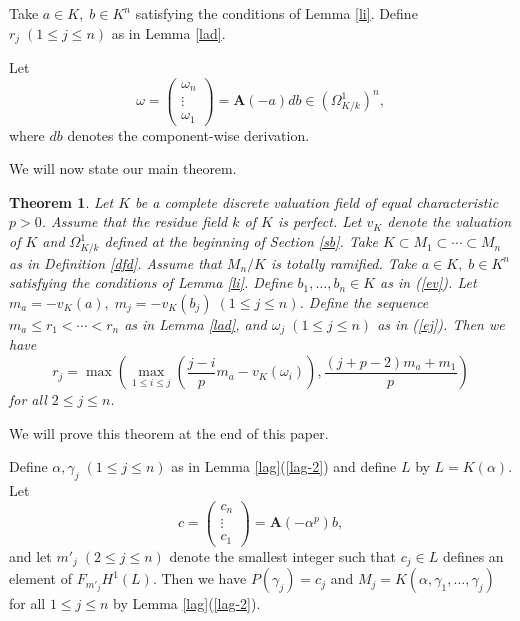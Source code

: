 \documentclass[10pt,a4paper]{amsart}
\numberwithin{equation}{section}
\theoremstyle{plain}
\newtheorem{theo}{Theorem}[section]
\theoremstyle{definition}
\begin{document}
Take $a\in K,\;b\in K^{n}$ satisfying the conditions of Lemma \ref{li}. Define $r_j\;(1\leq j\leq n)$ as in Lemma \ref{lad}.

 Let
  \begin{equation}\label{ej}
 \omega=
  \begin{pmatrix}
    {\omega_n}\\
    \vdots\\
    {\omega_1}
  \end{pmatrix}=\mathbf{A}(-a)db\in (\Omega_{K/k}^1)^n,
  \end{equation}
  where $db$ denotes the component-wise derivation.

  We will now state our main theorem.


  \begin{theo}\label{ta}
    Let $K$ be a complete discrete valuation field of equal characteristic $p>0$. Assume that the residue field $k$ of $K$ is perfect. Let $v_K$ denote the valuation of $K$ and $\Omega_{K/k}^1$ defined at the beginning of Section \ref{sb}. Take $K\subset M_1\subset\cdots\subset M_n$ as in Definition \ref{dfd}. Assume that $M_n/K$ is totally ramified. Take $a\in K,\;b\in K^n$ satisfying the conditions of Lemma \ref{li}. Define $b_1,\ldots,b_n\in K$ as in (\ref{ev}). Let $m_a=-v_K(a),\;m_j=-v_K(b_j)\;(1\leq j\leq n)$. Define the sequence $m_a\leq r_1<\cdots<r_n$ as in Lemma \ref{lad}, and $\omega_j\;(1\leq j\leq n)$ as in (\ref{ej}). Then we have
  \begin{equation}\label{ez}
  r_{j}=\max\left(\max_{1\leq i\leq j}\left(\frac{j-i}{p}m_a-v_K\left(\omega_i\right)\right),\frac{(j+p-2)m_a+m_1}{p}\right)
  \end{equation}
  for all $2\leq j\leq n$.
  \end{theo}


  We will prove this theorem at the end of this paper.

   Define $\alpha,\gamma_j\;(1\leq j\leq n)$ as in Lemma \ref{lag}(\ref{lag-2}) and define $L$ by $L=K(\alpha)$. Let
  \begin{equation}\label{ead}
    c=\begin{pmatrix}
    c_n\\
    \vdots\\
    c_1
    \end{pmatrix}
    =\mathbf{A}(-\alpha^p)b,
  \end{equation}
  and let $m'_j\;(2\leq j\leq n)$ denote the smallest integer such that $c_j\in L$ defines an element of $F_{m'_j}H^1(L)$. Then we have $P(\gamma_j)=c_j$ and $M_j=K(\alpha,\gamma_1,\ldots,\gamma_j)$ for all $1\leq j\leq n$ by Lemma \ref{lag}(\ref{lag-2}).
\end{document}
